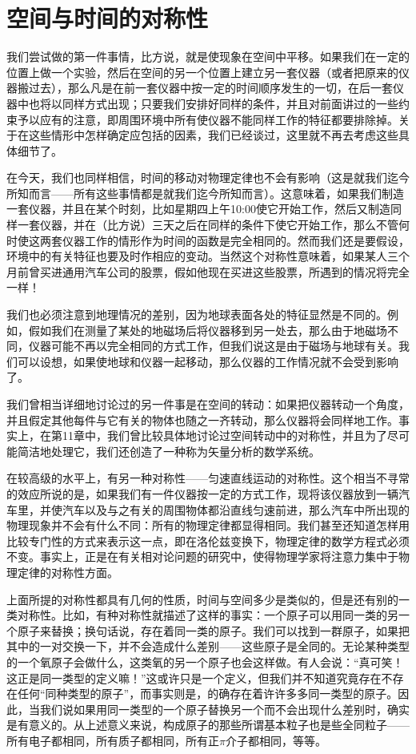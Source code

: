\section{空间与时间的对称性}

我们尝试做的第一件事情，比方说，就是使现象在空间中平移。如果我们在一定的位置上做一个实验，然后在空间的另一个位置上建立另一套仪器（或者把原来的仪器搬过去），那么凡是在前一套仪器中按一定的时间顺序发生的一切，在后一套仪器中也将以同样方式出现；只要我们安排好同样的条件，并且对前面讲过的一些约束予以应有的注意，即周围环境中所有使仪器不能同样工作的特征都要排除掉。关于在这些情形中怎样确定应包括的因素，我们已经谈过，这里就不再去考虑这些具体细节了。

在今天，我们也同样相信，时间的移动对物理定律也不会有影响（这是就我们迄今所知而言——所有这些事情都是就我们迄今所知而言）。这意味着，如果我们制造一套仪器，并且在某个时刻，比如星期四上午10:00使它开始工作，然后又制造同样一套仪器，并在（比方说）三天之后在同样的条件下使它开始工作，那么不管何时使这两套仪器工作的情形作为时间的函数是完全相同的。然而我们还是要假设，环境中的有关特征也要及时作相应的变动。当然这个对称性意味着，如果某人三个月前曾买进通用汽车公司的股票，假如他现在买进这些股票，所遇到的情况将完全一样！

我们也必须注意到地理情况的差别，因为地球表面各处的特征显然是不同的。例如，假如我们在测量了某处的地磁场后将仪器移到另一处去，那么由于地磁场不同，仪器可能不再以完全相同的方式工作，但我们说这是由于磁场与地球有关。我们可以设想，如果使地球和仪器一起移动，那么仪器的工作情况就不会受到影响了。

我们曾相当详细地讨论过的另一件事是在空间的转动：如果把仪器转动一个角度，并且假定其他每件与它有关的物体也随之一齐转动，那么仪器将会同样地工作。事实上，在第11章中，我们曾比较具体地讨论过空间转动中的对称性，并且为了尽可能简洁地处理它，我们还创造了一种称为矢量分析的数学系统。

在较高级的水平上，有另一种对称性——匀速直线运动的对称性。这个相当不寻常的效应所说的是，如果我们有一件仪器按一定的方式工作，现将该仪器放到一辆汽车里，并使汽车以及与之有关的周围物体都沿直线匀速前进，那么汽车中所出现的物理现象并不会有什么不同：所有的物理定律都显得相同。我们甚至还知道怎样用比较专门性的方式来表示这一点，即在洛伦兹变换下，物理定律的数学方程式必须不变。事实上，正是在有关相对论问题的研究中，使得物理学家将注意力集中于物理定律的对称性方面。

上面所提的对称性都具有几何的性质，时间与空间多少是类似的，但是还有别的一类对称性。比如，有种对称性就描述了这样的事实：一个原子可以用同一类的另一个原子来替换；换句话说，存在着同一类的原子。我们可以找到一群原子，如果把其中的一对交换一下，并不会造成什么差别——这些原子是全同的。无论某种类型的一个氧原子会做什么，这类氧的另一个原子也会这样做。有人会说：“真可笑！这正是同一类型的定义嘛！”这或许只是一个定义，但我们并不知道究竟存在不存在任何“同种类型的原子”，而事实则是，的确存在着许许多多同一类型的原子。因此，当我们说如果用同一类型的一个原子替换另一个而不会出现什么差别时，确实是有意义的。从上述意义来说，构成原子的那些所谓基本粒子也是些全同粒子——所有电子都相同，所有质子都相同，所有正$\pi$介子都相同，等等。

